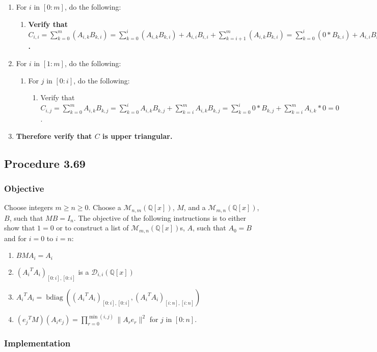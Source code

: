 \documentclass[twocolumn]{article}
\DeclareMathOperator{\bdiag}{bdiag}
\newcommand{\procedure}[2][]{\subsection*{Procedure #2 \ifthenelse{\equal{#1}{}}{}{(#1)}}\label{sec:procedure #2}}
\newcommand{\objective}{\subsubsection*{Objective}}
\newcommand{\implementation}{\subsubsection*{Implementation}}
\begin{document}
				\begin{enumerate}
					\item For $i$ in $[0:m]$, do the following:
					\begin{enumerate}
						\item \textbf{Verify that $C_{i,i}=\sum_{k=0}^m (A_{i,k}B_{k,i})=\sum_{k=0}^{i} (A_{i,k}B_{k,i})+A_{i,i}B_{i,i}+\sum_{k=i+1}^m (A_{i,k}B_{k,i})=\sum_{k=0}^{i} (0*B_{k,i})+A_{i,i}B_{i,i}+\sum_{k=i+1}^m (A_{i,k}*0)=A_{i,i}B_{i,i}$.}
					\end{enumerate}
					\item For $i$ in $[1:m]$, do the following:
					\begin{enumerate}
						\item For $j$ in $[0:i]$, do the following:
						\begin{enumerate}
							\item Verify that $C_{i,j}=\sum_{k=0}^m A_{i,k}B_{k,j}=\sum_{k=0}^{i} A_{i,k}B_{k,j}+\sum_{k=i}^m A_{i,k}B_{k,j}=\sum_{k=0}^{i} 0*B_{k,j}+\sum_{k=i}^m A_{i,k}*0=0$.
						\end{enumerate}
					\end{enumerate}
					\item \textbf{Therefore verify that $C$ is upper triangular.}
				\end{enumerate}
		\procedure{3.69}
			\objective
				Choose integers $m\ge n\ge 0$. Choose a $\mathcal{M}_{n,m}(\mathbb{Q}[x])$, $M$, and a $\mathcal{M}_{m,n}(\mathbb{Q}[x])$, $B$, such that $MB=I_n$. The objective of the following instructions is to either show that $1=0$ or to construct a list of $\mathcal{M}_{m,n}(\mathbb{Q}[x])$s, $A$, such that $A_0=B$ and for $i=0$ to $i=n$:
				\begin{enumerate}
					\item $BMA_i=A_i$
					\item $({A_i}^TA_i)_{[0:i],[0:i]}$ is a $\mathcal{D}_{i,i}(\mathbb{Q}[x])$
					\item ${A_i}^TA_i=\bdiag(({A_i}^TA_i)_{[0:i],[0:i]},\allowbreak({A_i}^TA_i)_{[i:n],[i:n]})$
					\item $({e_j}^TM)(A_ie_j)=\prod_{r=0}^{\min(i,j)}\lVert A_re_{r}\rVert^2$ for $j$ in $[0:n]$.
				\end{enumerate}
			\implementation
\end{document}
